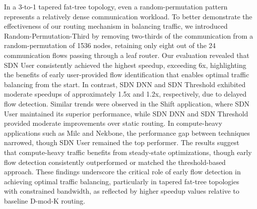 In a 3-to-1 tapered fat-tree topology, even a random-permutation pattern represents a relatively dense communication workload. To better demonstrate the effectiveness of our routing mechanism in balancing traffic, we introduced Random-Permutation-Third by removing two-thirds of the communication from a random-permutation of 1536 nodes, retaining only eight out of the 24 communication flows passing through a leaf router. Our evaluation revealed that SDN User consistently achieved the highest speedup, exceeding 6x, highlighting the benefits of early user-provided flow identification that enables optimal traffic balancing from the start. In contrast, SDN DNN and SDN Threshold exhibited moderate speedups of approximately 1.5x and 1.2x, respectively, due to delayed flow detection. Similar trends were observed in the Shift application, where SDN User maintained its superior performance, while SDN DNN and SDN Threshold provided moderate improvements over static routing. In compute-heavy applications such as Milc and Nekbone, the performance gap between techniques narrowed, though SDN User remained the top performer. The results suggest that compute-heavy traffic benefits from steady-state optimizations, though early flow detection consistently outperformed or matched the threshold-based approach. These findings underscore the critical role of early flow detection in achieving optimal traffic balancing, particularly in tapered fat-tree topologies with constrained bandwidth, as reflected by higher speedup values relative to baseline D-mod-K routing.

